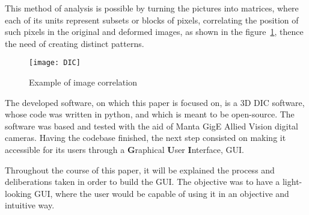 This method of analysis is possible by turning the pictures into matrices, where each of its units represent subsets or blocks of pixels, correlating the position of such pixels in the original and deformed images, as shown in the figure~\ref{fig:dic}, thence the need of creating distinct patterns.

\begin{figure}[h!]
	\centering
	\texttt{[image: DIC]}
	\caption{Example of image correlation}
	\label{fig:dic}
\end{figure}

The developed software, on which this paper is focused on, is a 3D DIC software, whose code was written in python, and which is meant to be open-source. The software was based and tested with the aid of Manta GigE Allied Vision digital cameras. %
Having the codebase finished, the next step consisted on making it accessible for its users through a \textbf{G}raphical \textbf{U}ser \textbf{I}nterface, GUI.

Throughout the course of this paper, it will be explained the process and deliberations taken in order to build the GUI. The objective was to have a light-looking GUI, where the user would be capable of using it in an objective and intuitive way.








